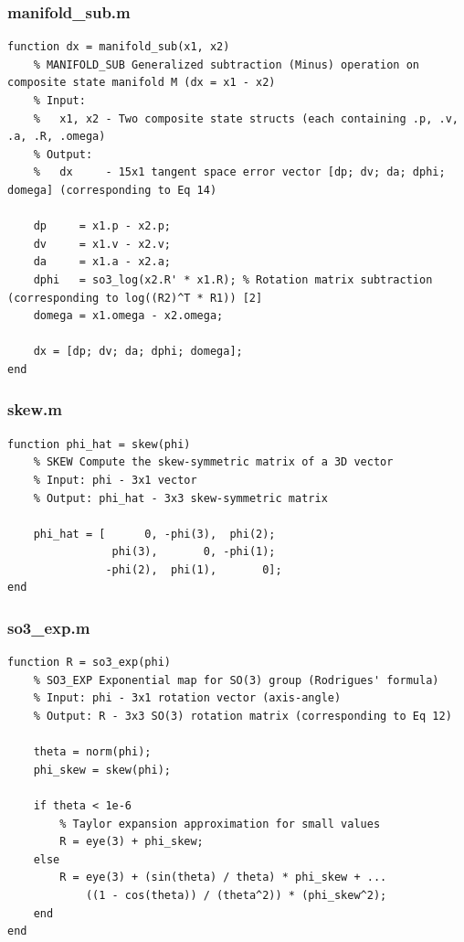 \documentclass[twocolumn,10pt]{article}
\begin{document}
\subsubsection{manifold\_sub.m}
\begin{lstlisting}
function dx = manifold_sub(x1, x2)
    % MANIFOLD_SUB Generalized subtraction (Minus) operation on composite state manifold M (dx = x1 - x2)
    % Input:
    %   x1, x2 - Two composite state structs (each containing .p, .v, .a, .R, .omega)
    % Output:
    %   dx     - 15x1 tangent space error vector [dp; dv; da; dphi; domega] (corresponding to Eq 14)
    
    dp     = x1.p - x2.p;
    dv     = x1.v - x2.v;
    da     = x1.a - x2.a;
    dphi   = so3_log(x2.R' * x1.R); % Rotation matrix subtraction (corresponding to log((R2)^T * R1)) [2]
    domega = x1.omega - x2.omega;
    
    dx = [dp; dv; da; dphi; domega];
end
\end{lstlisting}

\subsubsection{skew.m}
\begin{lstlisting}
function phi_hat = skew(phi)
    % SKEW Compute the skew-symmetric matrix of a 3D vector
    % Input: phi - 3x1 vector
    % Output: phi_hat - 3x3 skew-symmetric matrix
    
    phi_hat = [      0, -phi(3),  phi(2);
                phi(3),       0, -phi(1);
               -phi(2),  phi(1),       0];
end
\end{lstlisting}

\subsubsection{so3\_exp.m}
\begin{lstlisting}
function R = so3_exp(phi)
    % SO3_EXP Exponential map for SO(3) group (Rodrigues' formula)
    % Input: phi - 3x1 rotation vector (axis-angle)
    % Output: R - 3x3 SO(3) rotation matrix (corresponding to Eq 12)
    
    theta = norm(phi);
    phi_skew = skew(phi);
    
    if theta < 1e-6
        % Taylor expansion approximation for small values
        R = eye(3) + phi_skew;
    else
        R = eye(3) + (sin(theta) / theta) * phi_skew + ...
            ((1 - cos(theta)) / (theta^2)) * (phi_skew^2);
    end
end
\end{lstlisting}
\end{document}
